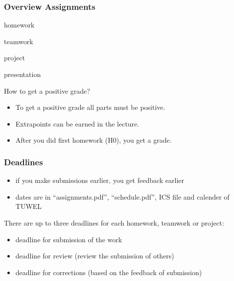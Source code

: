\breakframe

\begin{frame}
	\frametitle{Overview Assignments}
	\begin{description}[<+-| alert@+>]
	\item[30\,\%:] homework
	\item[30\,\%:] teamwork
	\item[40\,\%:] project
	\item[0\,\%:] presentation
	\end{description}

	\pause[\thebeamerpauses]

	\begin{quest}
	How to get a positive grade?
	\end{quest}

	\pause

	\begin{itemize}[<+-| alert@+>]
	\item To get a positive grade all parts must be positive.
	\item Extrapoints can be earned in the lecture.
	\item After you did first homework (H0), you get a grade.
	\end{itemize}
\end{frame}

\begin{frame}
	\frametitle{Deadlines}

	\begin{itemize}[<+-| alert@+>]
	\item if you make submissions earlier, you get feedback earlier
	\item dates are in ``assignments.pdf'', ``schedule.pdf'', ICS file and calender of TUWEL
	\end{itemize}

	\pause[\thebeamerpauses]
	\vspace{1em}

	There are up to three deadlines for each homework, teamwork or project:

	\begin{itemize}[<+-| alert@+>]
	\item deadline for submission of the work
	\item deadline for review (review the submission of others)
	\item deadline for corrections (based on the feedback of submission)
	\end{itemize}
\end{frame}

